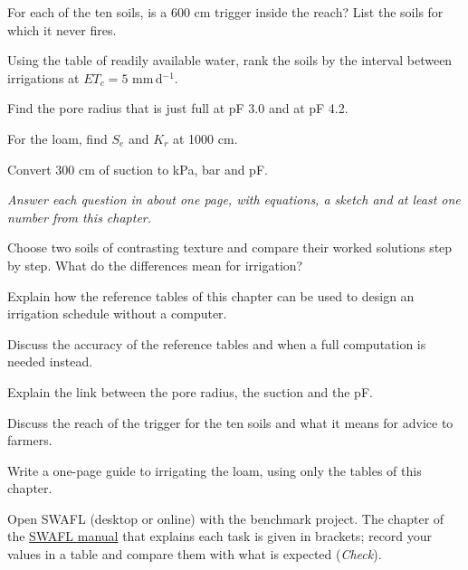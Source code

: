 \begin{exlist}
\item For each of the ten soils, is a 600 cm trigger inside the reach? List the soils for which it never fires.
\item Using the table of readily available water, rank the soils by the interval between irrigations at $ET_c=5$ mm\,d$^{-1}$.
\item Find the pore radius that is just full at pF 3.0 and at pF 4.2.
\item For the loam, find $S_e$ and $K_r$ at 1000 cm.
\item Convert 300 cm of suction to kPa, bar and pF.
\end{exlist}
{\small\itshape Answer each question in about one page, with equations, a sketch and at least one number from this chapter.}\par\vspace{3pt}
\begin{exlist}
\item Choose two soils of contrasting texture and compare their worked solutions step by step. What do the differences mean for irrigation?
\item Explain how the reference tables of this chapter can be used to design an irrigation schedule without a computer.
\item Discuss the accuracy of the reference tables and when a full computation is needed instead.
\item Explain the link between the pore radius, the suction and the pF.
\item Discuss the reach of the trigger for the ten soils and what it means for advice to farmers.
\item Write a one-page guide to irrigating the loam, using only the tables of this chapter.
\end{exlist}
{\small Open SWAFL (desktop or online) with the benchmark project. The chapter of the \href{https://github.com/halilunaziru73-creator/Coupled-Water-Fluxes-Pore-Scale-Dynamics-Precision-Irrigation-Mulching-Feedback-Loops/raw/main/Software/v1.1.0/SWAFL_Desktop/docs/manual_v1.1.0/SWAFL_Manual_v1.1.0.pdf}{SWAFL manual} that explains each task is given in brackets; record your values in a table and compare them with what is expected (\emph{Check}).}\par\vspace{3pt}
